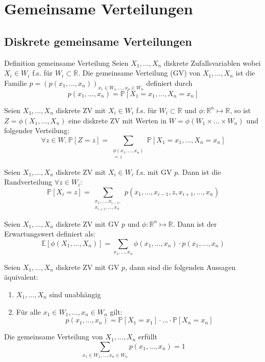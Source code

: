 \documentclass[a4paper,10pt]{article}
\def\R{\mathbb{R}}
\def\P{\mathbb{P}}
\def\E{\mathbb{E}}
\begin{document}
\section{Gemeinsame Verteilungen}
\subsection{Diskrete gemeinsame Verteilungen}
\begin{subbox}{Definition gemeinsame Verteilung}
	Seien \(X_1, \ldots, X_n\) diskrete Zufallsvariablen wobei \(X_i \in W_i\) f.s. für \(W_i \subset \R\). Die gemeinsame Verteilung (GV) von \(X_1, \ldots, X_n\) ist die Familie \(p = (p(x_1, \ldots, x_n))_{x_1 \in W_1, \ldots, x_n \in W_n}\) definiert durch
	\[p(x_1, \ldots, x_n) = \P[X_1 = x_1, \ldots, X_n = x_n]\]
\end{subbox}

Seien \(X_1,\ldots,X_n\) diskrete ZV mit \(X_i \in W_i\) f.s. für \(W_i \subset \R\) und \(\phi: \R^n \mapsto \R\), so ist \(Z = \phi(X_1, \ldots, X_n)\) eine diskrete ZV mit Werten in \(W = \phi(W_1 \times \ldots \times W_n)\) und folgender Verteilung:
\[\forall z \in W. \ \P[Z = z] = \sum_{\substack{\phi(x_1, \ldots, x_n) \\= z}} \P[X_1 = x_1, \ldots, X_n = x_n]\]

Seien \(X_1,\ldots,X_n\) diskrete ZV mit \(X_i \in W_i\) f.s. mit GV \(p\). Dann ist die Randverteilung \(\forall z \in W_i\):
\[\P[X_i = z] = \sum_{\substack{x_1, \ldots, x_{i-1}, \\x_{i+1},\ldots,x_n}} p(x_1, \ldots, x_{i-1}, z, x_{i+1},\ldots,x_n)\]

Seien \(X_1,\ldots,X_n\) diskrete ZV mit GV \(p\) und \(\phi : \R^n \mapsto \R\). Dann ist der Erwartungswert definiert als:
\[\E[\phi(X_1, \ldots, X_n)] = \sum_{x_1,\ldots,x_n} \phi(x_1,\ldots,x_n) \cdot p(x_1,\ldots,x_n)\]

Seien \(X_1,\ldots,X_n\) diskrete ZV mit GV \(p\), dann sind die folgenden Aussagen äquivalent:
\begin{enumerate}
	\item \(X_1,\ldots,X_n\) sind unabhängig
	\item Für alle \(x_1 \in W_1, \ldots, x_n \in W_n\) gilt:
		\[p(x_1,\ldots,x_n) = \P[X_1 = x_1] \cdot \ldots \cdot \P[X_n = x_n]\]
\end{enumerate}

Die gemeinsame Verteilung von \(X_1, \ldots, X_n\) erfüllt
\[\sum_{x_1\in W_1, \ldots, x_n \in W_n} p(x_1, \ldots, x_n) = 1\]
\end{document}
